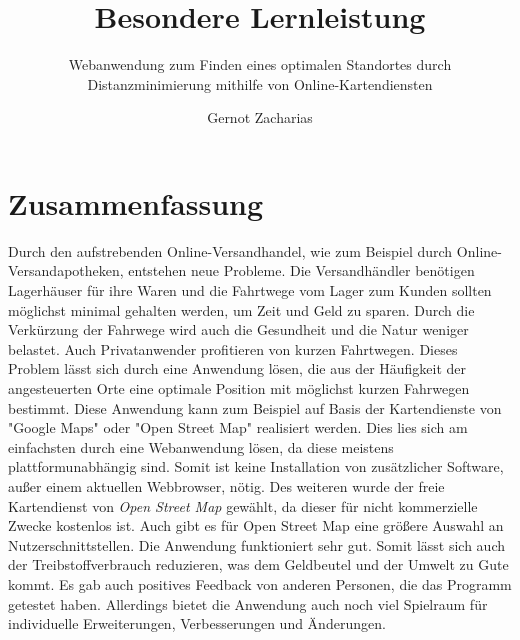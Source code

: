\documentclass[a4paper, twoside, 12pt]{scrreprt}
\title{Besondere Lernleistung}
\author{Gernot Zacharias}
\subtitle{Webanwendung zum Finden eines optimalen Standortes durch Distanzminimierung mithilfe von Online-Kartendiensten}
\begin{document}
\maketitle
\cleardoublepage
\tableofcontents
\setcounter{page}{1}
\chapter*{Zusammenfassung}
Durch den aufstrebenden Online-Versandhandel, wie zum Beispiel durch Online-Versandapotheken, entstehen neue Probleme.
Die Versandhändler benötigen Lagerhäuser für ihre Waren und die Fahrtwege vom Lager zum Kunden sollten möglichst minimal gehalten werden, um Zeit und Geld zu sparen.
Durch die Verkürzung der Fahrwege wird auch die Gesundheit und die Natur weniger belastet.
Auch Privatanwender profitieren von kurzen Fahrtwegen.
Dieses Problem lässt sich durch eine Anwendung lösen, die aus der Häufigkeit der angesteuerten Orte eine optimale Position mit möglichst kurzen Fahrwegen bestimmt.
Diese Anwendung kann zum Beispiel auf Basis der Kartendienste von "Google Maps" oder "Open Street Map" realisiert werden.
Dies lies sich am einfachsten durch eine Webanwendung lösen, da diese meistens plattformunabhängig sind.
Somit ist keine Installation von zusätzlicher Software, außer einem aktuellen Webbrowser, nötig.
Des weiteren wurde der freie Kartendienst von \emph{Open Street Map} gewählt, da dieser für nicht kommerzielle Zwecke kostenlos ist.
Auch gibt es für Open Street Map eine größere Auswahl an Nutzerschnittstellen.
Die Anwendung funktioniert sehr gut.%
Somit lässt sich auch der Treibstoffverbrauch reduzieren, was dem Geldbeutel und der Umwelt zu Gute kommt.
Es gab auch positives Feedback von anderen Personen, die das Programm getestet haben.
Allerdings bietet die Anwendung auch noch viel Spielraum für individuelle Erweiterungen, Verbesserungen und Änderungen.
\end{document}
